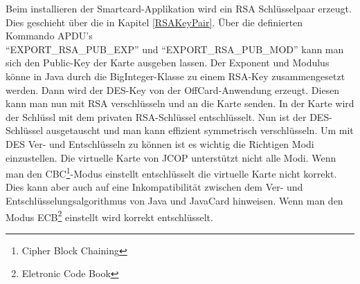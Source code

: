 \documentclass[parskip]{scrartcl}
\begin{document}
		Beim installieren der Smartcard-Applikation wird ein RSA Schlüsselpaar erzeugt. Dies geschieht über die in Kapitel \ref{RSAKeyPair}. Über die definierten Kommando APDU's \\\enquote{EXPORT\_RSA\_PUB\_EXP} und \enquote{EXPORT\_RSA\_PUB\_MOD} kann man sich den Public-Key der Karte ausgeben lassen. Der Exponent und Modulus könne in Java durch die BigInteger-Klasse zu einem RSA-Key zusammengesetzt werden. Dann wird der DES-Key von der OffCard-Anwendung erzeugt. Diesen kann man nun mit RSA verschlüsseln und an die Karte senden. In der Karte wird der Schlüssl mit dem privaten RSA-Schlüssel entschlüsselt. Nun ist der DES-Schlüssel ausgetauscht und man kann effizient symmetrisch verschlüsseln. Um mit DES Ver- und Entschlüsseln zu können ist es wichtig die Richtigen Modi einzustellen. Die virtuelle Karte von JCOP unterstützt nicht alle Modi. Wenn man den CBC\footnote{Cipher Block Chaining}-Modus einstellt entschlüsselt die virtuelle Karte nicht korrekt. Dies kann aber auch auf eine Inkompatibilität zwischen dem Ver- und Entschlüsselungsalgorithmus von Java und JavaCard hinweisen. Wenn man den Modus ECB\footnote{Eletronic Code Book} einstellt wird korrekt entschlüsselt. 
\end{document}
